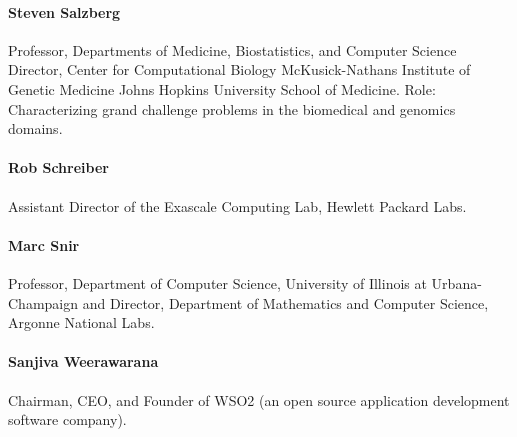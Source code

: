 \paragraph{Steven Salzberg} Professor, Departments of Medicine, Biostatistics, and Computer Science
Director, Center for Computational Biology
McKusick-Nathans Institute of Genetic Medicine
Johns Hopkins University School of Medicine.
Role: Characterizing grand challenge problems in the biomedical and genomics domains.

\paragraph{Rob Schreiber} Assistant Director of the Exascale Computing Lab, Hewlett Packard Labs.

\paragraph{Marc Snir} Professor, Department of Computer Science, University of Illinois at Urbana-Champaign and  Director, Department of Mathematics and Computer Science, Argonne National Labs.

\paragraph{Sanjiva Weerawarana} Chairman, CEO, and Founder of WSO2 (an open source application development software company).
